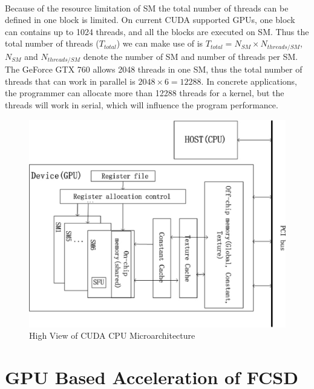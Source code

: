 \documentclass[12pt,a4paper,final]{article}
\begin{document}
\begin{spacing}{2.5}
\paragraph{}Because of the resource limitation of SM the total number of threads can be defined in one block is limited. On current CUDA supported GPUs, one block can contains up to 1024 threads, and all the blocks are executed on SM. Thus the total number of threads ($T_{total}$) we can make use of is $T_{total}=N_{SM}\times N_{threads/SM} $, $N_{SM}$ and $N_{threads/SM}$ denote the number of SM and number of threads per SM. The GeForce GTX 760 allows 2048 threads in one SM, thus the total number of threads that can work in parallel is $2048\times 6=12288$. In concrete applications, the programmer can allocate more than 12288 threads for a kernel, but the threads will work in serial, which will influence the program performance. 
\begin{figure}[htb]
\centering
\includegraphics[scale=0.6]{High_view_of_CUDA_GPU_microarchitecture.eps}
\caption{High View of CUDA CPU Microarchitecture}
\label{figure2}
\end{figure}   
\section{GPU Based Acceleration of FCSD}\label{GPUFCSD}

\end{spacing}
\end{document}
